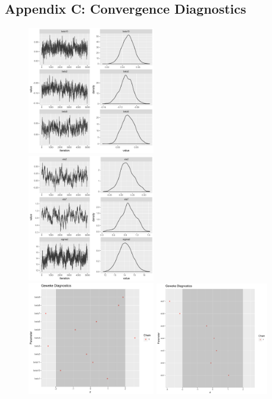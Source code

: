 \documentclass[ba]{imsart}
\numberwithin{equation}{section}
\theoremstyle{plain}
\begin{document}
	\subsection*{Appendix C: Convergence Diagnostics}\label{subsec: convergence}
	\begin{figure}[H]
		\centering
		\includegraphics[width=0.495\textwidth]{img/betatrace.pdf}	
		\includegraphics[width=0.495\textwidth]{img/etatrace.pdf}	
		\includegraphics[width=0.495\textwidth]{img/betageweke.pdf}	
		\includegraphics[width=0.44\textwidth]{img/etageweke.pdf}

\end{figure}
\end{document}
